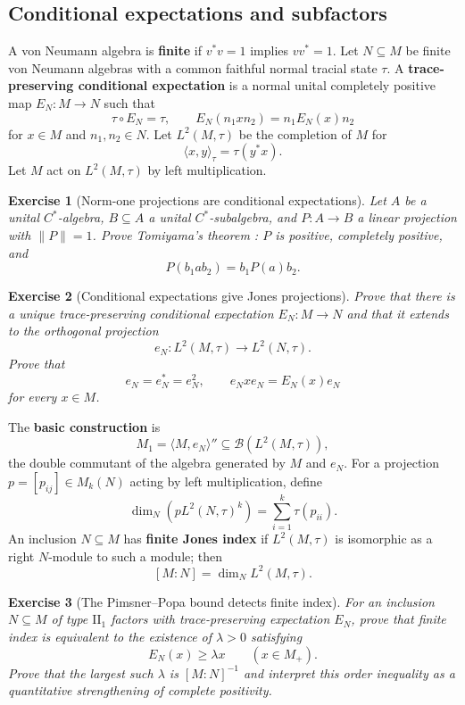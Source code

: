 \documentclass{article}
\newtheorem{exercise}{Exercise}
\begin{document}
\subsection{Conditional expectations and subfactors}

A von Neumann algebra is \textbf{finite} if $v^*v=1$ implies $vv^*=1$. Let
$N\subseteq M$ be finite von Neumann algebras with a common faithful normal
tracial state $\tau$. A \textbf{trace-preserving conditional expectation} is
a normal unital completely positive map $E_N:M\to N$ such that
\[
\tau\circ E_N=\tau,
\qquad
E_N(n_1xn_2)=n_1E_N(x)n_2
\]
for $x\in M$ and $n_1,n_2\in N$. Let $L^2(M,\tau)$ be the completion of $M$ for
\[
\langle x,y\rangle_\tau=\tau(y^*x).
\]
Let $M$ act on $L^2(M,\tau)$ by left multiplication.

\begin{exercise}[Norm-one projections are conditional expectations]
\leavevmode\par
\textit{Let $A$ be a unital $C^*$-algebra, $B\subseteq A$ a unital
$C^*$-subalgebra, and $P:A\to B$ a linear projection with $\|P\|=1$. Prove
Tomiyama's theorem \cite{tomiyama}: $P$ is positive, completely positive, and}
\[
P(b_1ab_2)=b_1P(a)b_2.
\]
\end{exercise}

\begin{exercise}[Conditional expectations give Jones projections]
\leavevmode\par
\textit{Prove that there is a unique trace-preserving conditional
expectation $E_N:M\to N$ and that it extends to the orthogonal projection}
\[
e_N:L^2(M,\tau)\longrightarrow L^2(N,\tau).
\]
\textit{Prove that}
\[
e_N=e_N^*=e_N^2,
\qquad
e_Nxe_N=E_N(x)e_N
\]
\textit{for every $x\in M$.}
\end{exercise}

The \textbf{basic construction} is
\[
M_1=\langle M,e_N\rangle''
\subseteq\mathcal B(L^2(M,\tau)),
\]
the double commutant of the algebra generated by $M$ and $e_N$. For a projection $p=[p_{ij}]\in M_k(N)$ acting by left multiplication, define
\[
\dim_N\!\left(pL^2(N,\tau)^k\right)=\sum_{i=1}^k\tau(p_{ii}).
\]
An inclusion $N\subseteq M$ has \textbf{finite Jones index} if $L^2(M,\tau)$ is isomorphic as a right $N$-module to such a module; then
\[
[M:N]=\dim_NL^2(M,\tau).
\]

\begin{exercise}[The Pimsner--Popa bound detects finite index]
\leavevmode\par
\textit{For an inclusion $N\subseteq M$ of type $\mathrm{II}_1$ factors
with trace-preserving expectation $E_N$, prove that finite index is
equivalent to the existence of $\lambda>0$ satisfying}
\cite{pimsner-popa}
\[
E_N(x)\geq\lambda x\qquad(x\in M_+).
\]
\textit{Prove that the largest such $\lambda$ is $[M:N]^{-1}$ and interpret
this order inequality as a quantitative strengthening of complete
positivity.}
\end{exercise}
\end{document}

